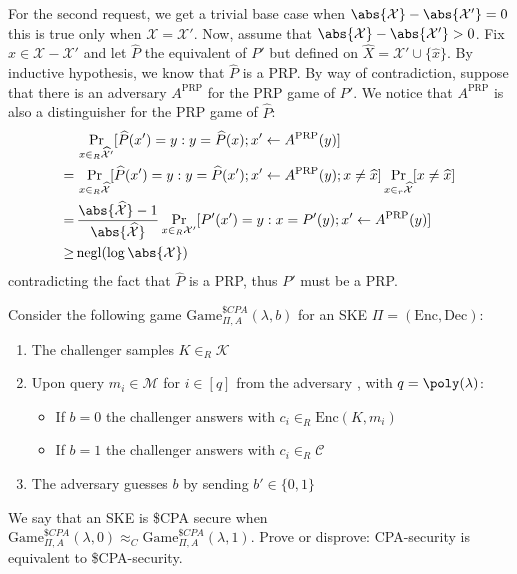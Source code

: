 \documentclass[a4paper, 12pt]{report}
\begin{document}
    For the second request, we get a trivial base case when $\abs{\mathcal{X}}-\abs{\mathcal{X}'} = 0$ this is true only when $\mathcal{X} = \mathcal{X}'$. Now, assume that $\abs{\mathcal{X}}-\abs{\mathcal{X}'} > 0$. Fix $\widehat x \in \mathcal{X}-\mathcal{X}'$ and let $\widehat P$ the equivalent of $P'$ but defined on $\widehat X = \mathcal{X}' \cup \{\widehat{x}\}$. By inductive hypothesis, we know that $\widehat P$ is a PRP. By way of contradiction, suppose that there is an adversary $A^{\text{PRP}}$ for the PRP game of $P'$. We notice that $A^{\text{PRP}}$ is also a distinguisher for the PRP game of $\widehat P$:
    \[\begin{split}
        &\Pr_{x \in_R \widehat{\mathcal{X}}'}[\widehat{P}(x') = y : y = \widehat{P}(x); x' \gets A^{\text{PRP}}(y)] \\
        =\,& \Pr_{x \in_R \widehat{\mathcal{X}}}[\widehat{P}(x') = y : y = \widehat{P}(x'); x' \gets A^{\text{PRP}}(y); x \neq \widehat x] \Pr_{x \in_r \widehat{\mathcal{X}}}[x \neq \widehat x] \\
        =\,& \frac{\abs{\widehat{\mathcal{X}}}-1}{\abs{\widehat{\mathcal{X}}}} \Pr_{x \in_R \mathcal{X}'}[P'(x') = y : x = P'(y); x' \gets A^{\text{PRP}}(y)] \\
        \geq\,& \mathrm{negl}(\log \abs{\mathcal{X}})
    \end{split} \]
    contradicting the fact that $\widehat P$ is a PRP, thus $P'$ must be a PRP.

    \begin{framedprob}{}
        Consider the following game $\mathrm{Game}_{\Pi,A}^{\$CPA}(\lambda, b)$ for an SKE $\Pi = (\mathrm{Enc}, \mathrm{Dec})$:
        \begin{enumerate}
            \item The challenger samples $K \in_R \mathcal{K}$
            \item Upon query $m_i \in \mathcal{M}$ for $i \in [q]$ from the adversary , with $q = \poly(\lambda)$:
            \begin{itemize}
                \item If $b = 0$ the challenger answers with $c_i \in_R \mathrm{Enc}(K, m_i)$
                \item If $b = 1$ the challenger answers with $c_i \in_R \mathcal{C}$
            \end{itemize}
            \item The adversary guesses $b$ by sending $b' \in \{0,1\}$
        \end{enumerate}

        We say that an SKE is \$CPA secure when $\mathrm{Game}_{\Pi,A}^{\$CPA}(\lambda, 0) \approx_C \mathrm{Game}_{\Pi,A}^{\$CPA}(\lambda, 1)$. Prove or disprove: CPA-security is equivalent to \$CPA-security.
    \end{framedprob}
\end{document}
